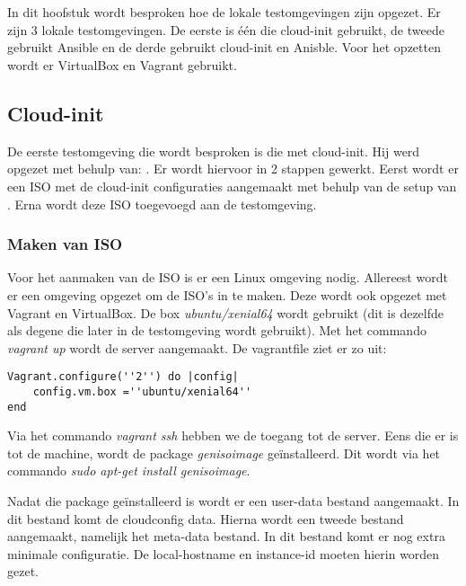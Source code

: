 \chapter{}
\label{ch:testlokaal}

In dit hoofstuk wordt besproken hoe de lokale testomgevingen zijn opgezet. Er zijn 3 lokale testomgevingen. De eerste is één die cloud-init gebruikt, de tweede gebruikt Ansible en de derde gebruikt cloud-init en Anisble. Voor het opzetten wordt er VirtualBox en Vagrant gebruikt.

\section{Cloud-init}
De eerste testomgeving die wordt besproken is die met cloud-init. Hij werd opgezet met behulp van: \autocite{cloudVagrant}. Er wordt hiervoor in 2 stappen gewerkt. Eerst wordt er een ISO met de cloud-init configuraties aangemaakt met behulp van de setup van \autocite{cloudVagrant}. Erna wordt deze ISO toegevoegd aan de testomgeving.

\subsection{Maken van ISO}
Voor het aanmaken van de ISO is er een Linux omgeving nodig. Allereest wordt er een omgeving opgezet om de ISO's in te maken. Deze wordt ook opgezet met Vagrant en VirtualBox. De box \textit{ubuntu/xenial64} wordt gebruikt (dit is dezelfde als degene die later in de testomgeving wordt gebruikt). Met het commando \textit{vagrant up} wordt de server aangemaakt. De vagrantfile ziet er zo uit:
\begin{lstlisting}
Vagrant.configure(''2'') do |config|
	config.vm.box =''ubuntu/xenial64''
end
\end{lstlisting}

Via het commando \textit{vagrant ssh} hebben we de toegang tot de server. Eens die er is tot de machine, wordt de package \textit{genisoimage} geïnstalleerd. Dit wordt via het commando \textit{sudo apt-get install genisoimage}. 

Nadat die package geïnstalleerd is wordt er een user-data bestand aangemaakt. In dit bestand komt de cloudconfig data. Hierna wordt een tweede bestand aangemaakt, namelijk het meta-data bestand. In dit bestand komt er nog extra minimale configuratie. De local-hostname en instance-id moeten hierin worden gezet.

